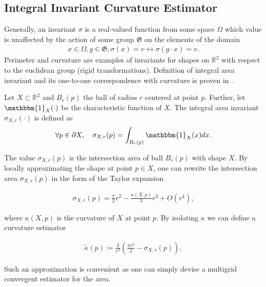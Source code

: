 \documentclass[runningheads]{llncs}
\begin{document}
\subsection{Integral Invariant Curvature Estimator}
Generally, an invariant $\sigma$ is a real-valued function from some space $\Omega$ which value is unaffected by the action
of some group $\mathfrak{G}$ on the elements of the domain
\begin{align*}
  x \in \Omega, g \in \mathfrak{G}, \sigma(x) = v \longleftrightarrow \sigma(g \cdot x ) = v.
\end{align*}
Perimeter and curvature are examples of invariants for shapes on $\mathbb{R}^2$ with respect to the euclidean group
(rigid transformations). Definition of integral area invariant and its one-to-one correspondence with curvature is
proven in \cite{manay04}.


\begin{definition}
  Let $X \subset \mathbb{R}^2$ and $B_r(p)$ the ball of radius $r$ centered at point $p$. Further, let
  $\mathbbm{1}_X(\cdot)$ be the characteristic function of $X$. The integral area invariant $\sigma_{X,r}(\cdot)$ is
  defined as
  \begin{align*}
    \forall p \in \partial X, \quad \sigma_{X,r}(p) = \int_{B_r(p)}{ \mathbbm{1}_X(x) dx}.
  \end{align*}
\end{definition}


The value $\sigma_{X,r}(p)$ is the intersection area of ball $B_r(p)$ with shape $X$. By locally approximating the shape
at point $p \in X$, one can rewrite the intersection area $\sigma_{X,r}(p)$ in the form of the Taylor expansion
\cite{pottman09}
	
\begin{align*}
  \sigma_{X,r}(p) = \frac{\pi}{2}r^2 - \frac{\kappa(X,p)}{3}r^3 + O(r^4),
\end{align*}
		
where $\kappa(X,p)$ is the curvature of $X$ at point $p$. By isolating $\kappa$ we can define a curvature estimator
	
\begin{align}
  \tilde{\kappa}(p) \coloneqq \frac{3}{r^3}\left( \frac{\pi r^2}{2} - \sigma_{X,r}(p) \right),
  \label{eq:curvature_approximation}
\end{align}
	
Such an approximation is convenient as one can simply devise a multigrid convergent estimator for the area.
\end{document}
